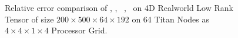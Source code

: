 
\begin{figure}
	\caption{Relative error comparison of \MU, \HALS, \BPP\, \ADMM, \Nestrov\ on 4D Realworld Low Rank Tensor of size $200 \times 500 \times 64 \times 192$ on 64 Titan Nodes as $4\times4\times1\times4$ Processor Grid.}
	\label{fig:convergencerealworld}
\end{figure}



